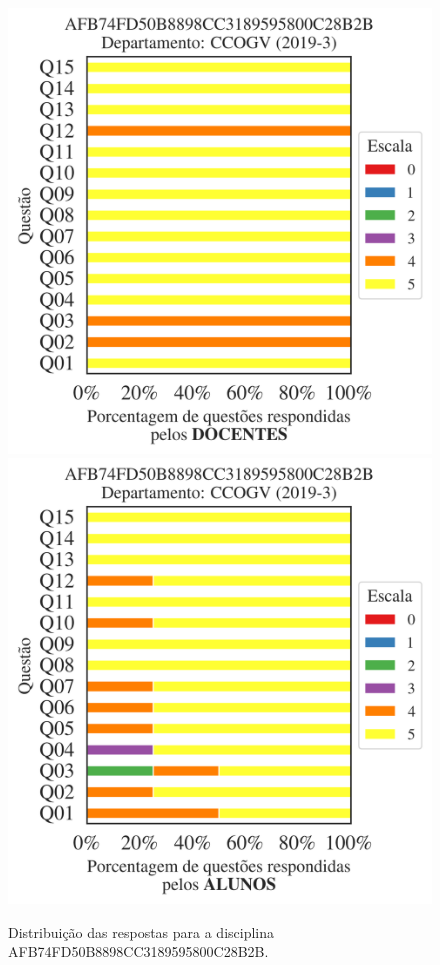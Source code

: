 \documentclass[a4paper,10pt]{article}
\begin{document}
\begin{figure}[h]
\centering
\includegraphics[width=0.485\linewidth]{analise_disciplina_departamento_CCOGV_AFB74FD50B8898CC3189595800C28B2B_docentes.png}
\includegraphics[width=0.485\linewidth]{analise_disciplina_departamento_CCOGV_AFB74FD50B8898CC3189595800C28B2B_alunos.png}
\caption{\label{fig:analise_geral_departamento}                Distribuição das respostas para a disciplina AFB74FD50B8898CC3189595800C28B2B. }
\end{figure}
\end{document}
